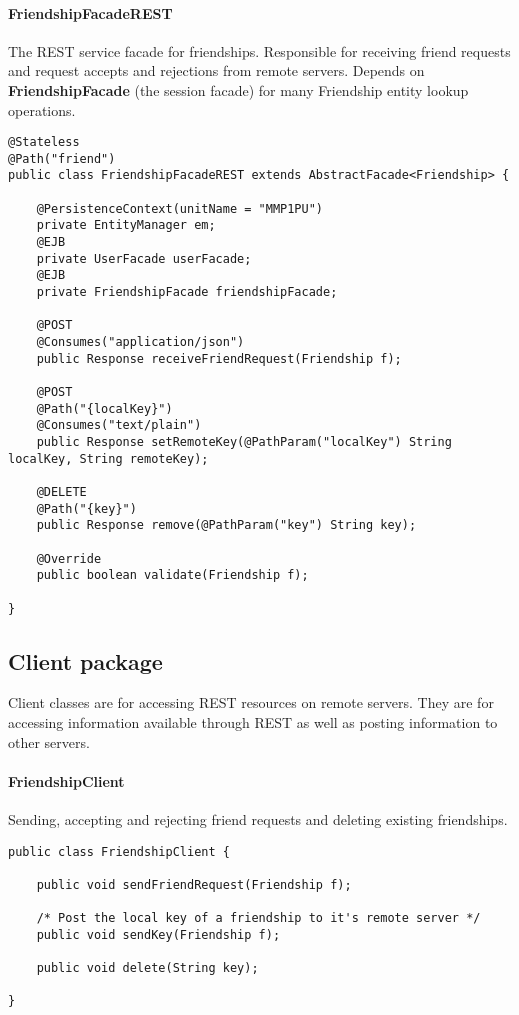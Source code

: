 \paragraph{FriendshipFacadeREST} The REST service facade for friendships. Responsible for receiving friend requests and request accepts and rejections from remote servers. Depends on \textbf{FriendshipFacade} (the session facade) for many Friendship entity lookup operations.
\begin{small}\begin{verbatim}
@Stateless
@Path("friend")
public class FriendshipFacadeREST extends AbstractFacade<Friendship> {

    @PersistenceContext(unitName = "MMP1PU")
    private EntityManager em;
    @EJB
    private UserFacade userFacade;
    @EJB
    private FriendshipFacade friendshipFacade;

    @POST
    @Consumes("application/json")
    public Response receiveFriendRequest(Friendship f);

    @POST
    @Path("{localKey}")
    @Consumes("text/plain")
    public Response setRemoteKey(@PathParam("localKey") String localKey, String remoteKey);

    @DELETE
    @Path("{key}")
    public Response remove(@PathParam("key") String key);

    @Override
    public boolean validate(Friendship f);
    
}
\end{verbatim}\end{small}

\clearpage
\subsection{Client package}
Client classes are for accessing REST resources on remote servers. They are for accessing information available through REST as well as posting information to other servers.

\paragraph{FriendshipClient} Sending, accepting and rejecting friend requests and deleting existing friendships.
\begin{small}\begin{verbatim}
public class FriendshipClient {

    public void sendFriendRequest(Friendship f);

    /* Post the local key of a friendship to it's remote server */
    public void sendKey(Friendship f);

    public void delete(String key);

}
\end{verbatim}\end{small}



